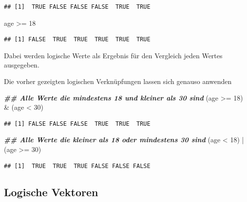\documentclass[
]{book}
\newenvironment{Shaded}{\begin{snugshade}}{\end{snugshade}}
\newcommand{\DecValTok}[1]{\textcolor[rgb]{0.00,0.00,0.81}{#1}}
\newcommand{\DocumentationTok}[1]{\textcolor[rgb]{0.56,0.35,0.01}{\textbf{\textit{#1}}}}
\newcommand{\NormalTok}[1]{#1}
\newcommand{\SpecialCharTok}[1]{\textcolor[rgb]{0.00,0.00,0.00}{#1}}
\begin{document}
\begin{verbatim}
## [1]  TRUE FALSE FALSE FALSE  TRUE  TRUE
\end{verbatim}

\begin{Shaded}
\begin{Highlighting}[]
\NormalTok{age }\SpecialCharTok{\textgreater{}=} \DecValTok{18}
\end{Highlighting}
\end{Shaded}

\begin{verbatim}
## [1] FALSE  TRUE  TRUE  TRUE  TRUE  TRUE
\end{verbatim}

Dabei werden logische Werte als Ergebnis für den Vergleich jeden Wertes ausgegeben.

Die vorher gezeigten logischen Verknüpfungen lassen sich genauso anwenden

\begin{Shaded}
\begin{Highlighting}[]
 \DocumentationTok{\#\# Alle Werte die mindestens 18 und kleiner als 30 sind}
\NormalTok{(age }\SpecialCharTok{\textgreater{}=} \DecValTok{18}\NormalTok{) }\SpecialCharTok{\&}\NormalTok{ (age }\SpecialCharTok{\textless{}} \DecValTok{30}\NormalTok{)}
\end{Highlighting}
\end{Shaded}

\begin{verbatim}
## [1] FALSE FALSE FALSE  TRUE  TRUE  TRUE
\end{verbatim}

\begin{Shaded}
\begin{Highlighting}[]
\DocumentationTok{\#\# Alle Werte die kleiner als 18 oder mindestens 30 sind}
\NormalTok{(age }\SpecialCharTok{\textless{}} \DecValTok{18}\NormalTok{) }\SpecialCharTok{|}\NormalTok{ (age }\SpecialCharTok{\textgreater{}=} \DecValTok{30}\NormalTok{) }
\end{Highlighting}
\end{Shaded}

\begin{verbatim}
## [1]  TRUE  TRUE  TRUE FALSE FALSE FALSE
\end{verbatim}

\hypertarget{logische-vektoren}{%
\subsection{Logische Vektoren}\label{logische-vektoren}}
\end{document}
